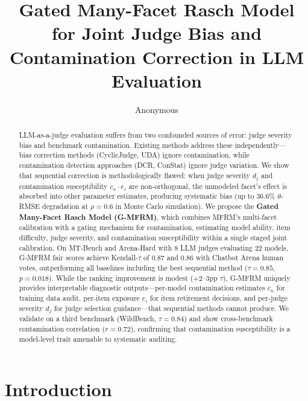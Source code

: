 \documentclass[11pt]{article}
\title{Gated Many-Facet Rasch Model for Joint Judge Bias and Contamination Correction in LLM Evaluation}
\author{Anonymous}
\date{}
\newcommand{\gmfrm}{G-MFRM}
\newcommand{\cn}{c_n}
\newcommand{\ei}{e_i}
\newcommand{\severity}{d_j}
\begin{document}
\maketitle

\begin{abstract}
LLM-as-a-judge evaluation suffers from two confounded sources of error: judge severity bias and benchmark contamination.
Existing methods address these independently---bias correction methods (CyclicJudge, UDA) ignore contamination, while contamination detection approaches (DCR, ConStat) ignore judge variation.
We show that sequential correction is methodologically flawed: when judge severity $\severity$ and contamination susceptibility $\cn \cdot \ei$ are non-orthogonal, the unmodeled facet's effect is absorbed into other parameter estimates, producing systematic bias (up to 36.6\% $\theta$-RMSE degradation at $\rho=0.6$ in Monte Carlo simulation).
We propose the \textbf{Gated Many-Facet Rasch Model (\gmfrm{})}, which combines MFRM's multi-facet calibration with a gating mechanism for contamination, estimating model ability, item difficulty, judge severity, and contamination susceptibility within a single staged joint calibration.
On MT-Bench and Arena-Hard with 8 LLM judges evaluating 22 models, \gmfrm{} fair scores achieve Kendall-$\tau$ of 0.87 and 0.86 with Chatbot Arena human votes, outperforming all baselines including the best sequential method ($\tau=0.85$, $p=0.018$).
While the ranking improvement is modest (+2--3pp $\tau$), \gmfrm{} uniquely provides interpretable diagnostic outputs---per-model contamination estimates $\cn$ for training data audit, per-item exposure $\ei$ for item retirement decisions, and per-judge severity $\severity$ for judge selection guidance---that sequential methods cannot produce.
We validate on a third benchmark (WildBench, $\tau=0.84$) and show cross-benchmark contamination correlation ($r=0.72$), confirming that contamination susceptibility is a model-level trait amenable to systematic auditing.
\end{abstract}

\section{Introduction}
\end{document}
